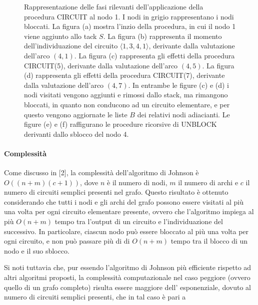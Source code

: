 \begin{figure}[!h]
{
}\label{fig:cf3_figure}
\caption{Rappresentazione delle fasi rilevanti dell'applicazione della procedura CIRCUIT al nodo 1. I nodi in grigio
rappresentano i nodi bloccati.
La figura (a) mostra l'inzio della procedura, in cui il nodo 1 viene aggiunto allo tack $S$.
La figura (b) rappresenta il momento dell'individuazione del circuito $\langle 1, 3, 4, 1 \rangle$,
    derivante dalla valutazione dell'arco $(4, 1)$.
La figura (c) rappresenta gli effetti della procedura CIRCUIT(5), derivante dalla valutazione dell'arco $(4, 5)$.
    La figura (d) rappresenta gli effetti della procedura CIRCUIT(7), derivante dalla valutazione dell'arco $(4, 7)$.
In entrambe le figure (c) e (d) i nodi visitati vengono aggiunti e rimossi dallo stack, ma rimangono bloccati,
    in quanto non conducono ad un circuito elementare, e per questo vengono aggiornate le liste $B$ dei relativi
    nodi adiacianti.
Le figure (e) e (f) raffigurano le procedure ricorsive di UNBLOCK derivanti dallo sblocco del nodo 4.}

\end{figure}

\newpage

\paragraph{Complessit\`a}\label{subsec:complessit`a}
Come discusso in [2], la complessit\`a dell'algoritmo di Johnson \`e $O((n + m)(c + 1))$, dove $n$ \`e il numero di nodi,
$m$ il numero di archi e $c$ il numero di circuiti semplici presenti nel grafo.
Questo risultato \`e ottenuto considerando che tutti i nodi e gli archi del grafo possono essere visitati al pi\`u una
volta per ogni circuito elementare presente, ovvero che l'algoritmo impiega al pi\`u $O(n + m)$ tempo tra l'output di
un circuito e l'individuazione del successivo.
In particolare, ciascun nodo pu\`o essere bloccato al pi\`u una volta per ogni circuito, e non pu\`o passare pi\`u di
di $O(n + m)$ tempo tra il blocco di un nodo e il suo sblocco. \newline

Si noti tuttavia che, pur essendo l'algoritmo di Johnson pi\`u efficiente rispetto ad altri algoritmi proposti, la
complessit\`a computazionale nel caso peggiore (ovvero quello di un grafo completo) risulta essere maggiore dell'
esponenziale, dovuto al numero di circuiti semplici presenti, che in tal caso \`e pari a

